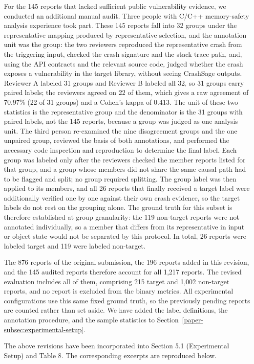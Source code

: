 \documentclass[onecolumn,11pt]{article}
\begin{document}
{For the 145 reports that lacked sufficient public vulnerability evidence, we conducted an additional manual audit. Three people with C/C++ memory-safety analysis experience took part. These 145 reports fall into 32 groups under the representative mapping produced by representative selection, and the annotation unit was the group: the two reviewers reproduced the representative crash from the triggering input, checked the crash signature and the stack trace path, and, using the API contracts and the relevant source code, judged whether the crash exposes a vulnerability in the target library, without seeing CrashSage outputs. Reviewer A labeled 31 groups and Reviewer B labeled all 32, so 31 groups carry paired labels; the reviewers agreed on 22 of them, which gives a raw agreement of 70.97\% (22 of 31 groups) and a Cohen's kappa of 0.413. The unit of these two statistics is the representative group and the denominator is the 31 groups with paired labels, not the 145 reports, because a group was judged as one analysis unit. The third person re-examined the nine disagreement groups and the one unpaired group, reviewed the basis of both annotations, and performed the necessary code inspection and reproduction to determine the final label. Each group was labeled only after the reviewers checked the member reports listed for that group, and a group whose members did not share the same causal path had to be flagged and split; no group required splitting. The group label was then applied to its members, and all 26 reports that finally received a target label were additionally verified one by one against their own crash evidence, so the target labels do not rest on the grouping alone. The ground truth for this subset is therefore established at group granularity: the 119 non-target reports were not annotated individually, so a member that differs from its representative in input or object state would not be separated by this protocol. In total, 26 reports were labeled target and 119 were labeled non-target.

The 876 reports of the original submission, the 196 reports added in this revision, and the 145 audited reports therefore account for all 1,217 reports. The revised evaluation includes all of them, comprising 215 target and 1,002 non-target reports, and no report is excluded from the binary metrics. All experimental configurations use this same fixed ground truth, so the previously pending reports are counted rather than set aside. We have added the label definitions, the annotation procedure, and the sample statistics to Section~\ref{paper-subsec:experimental-setup}.

The above revisions have been incorporated into Section 5.1 (Experimental Setup) and Table 8. The corresponding excerpts are reproduced below.}
\end{document}
